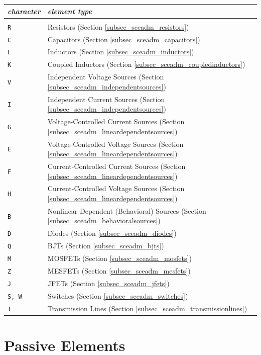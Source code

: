 \begin{tabular}{lp{14cm}}
\textit{character} & \textit{element type}\\ \hline \\ \vspace{-0.8\parskip}
\texttt{R} & Resistors (Section \ref{subsec_sceadm_resistors}) \\
\texttt{C} & Capacitors (Section \ref{subsec_sceadm_capacitors}) \\
\texttt{L} & Inductors (Section \ref{subsec_sceadm_inductors}) \\
\texttt{K} & Coupled Inductors (Section \ref{subsec_sceadm_coupledinductors}) \\
\texttt{V} & Independent Voltage Sources (Section \ref{subsec_sceadm_independentsources}) \\
\texttt{I} & Independent Current Sources (Section \ref{subsec_sceadm_independentsources}) \\
\texttt{G} & Voltage-Controlled Current Sources (Section \ref{subsec_sceadm_lineardependentsources}) \\
\texttt{E} & Voltage-Controlled Voltage Sources (Section \ref{subsec_sceadm_lineardependentsources}) \\
\texttt{F} & Current-Controlled Current Sources (Section \ref{subsec_sceadm_lineardependentsources}) \\
\texttt{H} & Current-Controlled Voltage Sources (Section \ref{subsec_sceadm_lineardependentsources}) \\ 
\texttt{B} & Nonlinear Dependent (Behavioral) Sources (Section \ref{subsec_sceadm_behavioralsources}) \\
\texttt{D} & Diodes (Section \ref{subsec_sceadm_diodes}) \\
\texttt{Q} & BJTs (Section \ref{subsec_sceadm_bjts}) \\
\texttt{M} & MOSFETs (Section \ref{subsec_sceadm_mosfets}) \\
\texttt{Z} & MESFETs (Section \ref{subsec_sceadm_mesfets}) \\
\texttt{J} & JFETs (Section \ref{subsec_sceadm_jfets}) \\
\texttt{S, W} & Switches (Section \ref{subsec_sceadm_switches}) \\
\texttt{T} & Transmission Lines (Section \ref{subsec_sceadm_transmissionlines}) \\

\end{tabular}
\newpage
\section{Passive Elements}
\label{sec_sceadm_passiveelements}


